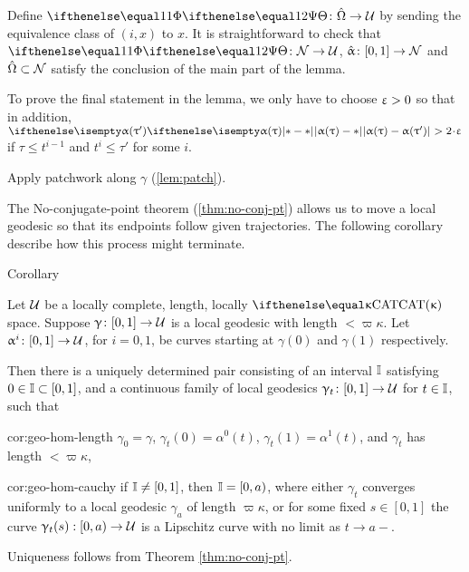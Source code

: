 Define $\map\:\hat\Omega\to\spc{U}$
by sending the equivalence class of $(i,x)$ to $x$.
It is straightforward to check that $\map\:\spc{N}\to\spc{U}$, $\hat\alpha\:[0,1]\to\spc{N}$ and $\hat\Omega\subset\spc{N}$ satisfy the conclusion of the main part of the lemma.

To prove the final statement in the lemma,
we only have to choose $\upvarepsilon>0$ so that in addition, $\dist{\alpha(\tau)}{\alpha(\tau')}{}>2\cdot\eps$ if $\tau\le t^{i-1}$ and $t^i\le\tau'$ for some $i$.
\qeds


Apply patchwork along $\gamma$ (\ref{lem:patch}). 
\qeds



The No-conjugate-point theorem (\ref{thm:no-conj-pt}) allows us to move a local geodesic  
so that its endpoints follow given trajectories.
The following corollary describe how this process might terminate. 

\begin{thm}{Corollary}\label{cor:geo-hom}{\sloppy 
Let $\mathcal{U}$ be a locally complete, length, locally $\CAT\kappa$ space.
Suppose $\gamma\:[0,1]\to\spc{U}$ is a local geodesic with length $< \varpi\kappa$.  Let $\alpha^i\:[0,1]\to \spc{U}$, for $i=0,1$, be curves starting at $\gamma(0)$ and $\gamma(1)$ respectively.  

}

Then there is a uniquely determined pair consisting of an interval $\mathbb{I} $ satisfying $0\in \II\subset[0,1]$, and a continuous family of local geodesics $\gamma_t\:[0,1]\to \spc{U}$ for  $t\in \II$, such that  

\begin{subthm}{cor:geo-hom-length}
$\gamma_0=\gamma$, $\gamma_t(0)=\alpha^0(t)$, $\gamma_t(1)=\alpha^1(t)$, and $\gamma_t$ has length $< \varpi\kappa$,
\end{subthm} 

\begin{subthm}{cor:geo-hom-cauchy}
if $\mathbb{I}\ne [0,1]$, then $\mathbb{I}=[0, a)$, where either $\gamma_t$ converges uniformly to a local geodesic $\gamma_a$ of length $\varpi\kappa$, or 
for some fixed $s\in [0,1]$ the curve $\gamma_t(s):[0,a)\to\spc{U}$ is a Lipschitz curve with no limit 
as $t\to a-$.
\end{subthm}

\end{thm}


 Uniqueness follows from  Theorem \ref{thm:no-conj-pt}.

